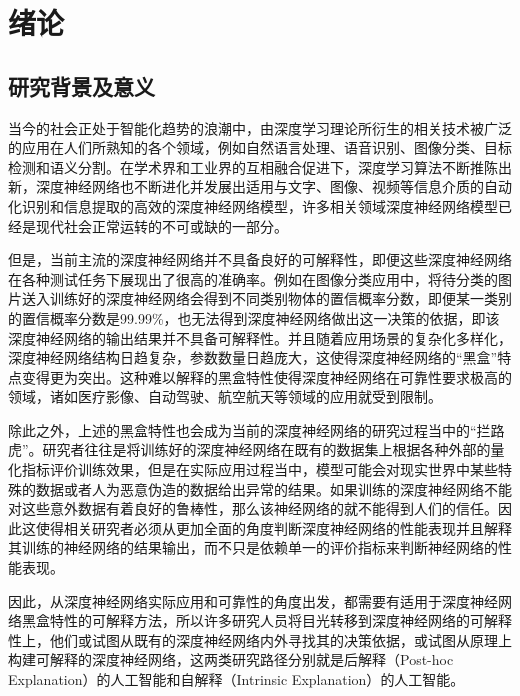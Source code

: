 


\chapter{绪论}
\thispagestyle{others}
\pagestyle{others}
\xiaosi

\section{研究背景及意义}
当今的社会正处于智能化趋势的浪潮中，由深度学习理论所衍生的相关技术被广泛的应用在人们所熟知的各个领域，例如自然语言处理\textsuperscript{\cite{language}}、语音识别\textsuperscript{\cite{voice}}、图像分类\textsuperscript{\cite{image,simonyan2014very}}、目标检测\textsuperscript{\cite{od1,od2}}和语义分割\textsuperscript{\cite{sg1,sg2}}。在学术界和工业界的互相融合促进下，深度学习算法不断推陈出新，深度神经网络也不断进化并发展出适用与文字、图像、视频等信息介质的自动化识别和信息提取的高效的深度神经网络模型，许多相关领域深度神经网络模型已经是现代社会正常运转的不可或缺的一部分。

但是，当前主流的深度神经网络并不具备良好的可解释性，即便这些深度神经网络在各种测试任务下展现出了很高的准确率。例如在图像分类应用中，将待分类的图片送入训练好的深度神经网络会得到不同类别物体的置信概率分数，即便某一类别的置信概率分数是99.99\%，也无法得到深度神经网络做出这一决策的依据\textsuperscript{\cite{machine}}，即该深度神经网络的输出结果并不具备可解释性。并且随着应用场景的复杂化多样化，深度神经网络结构日趋复杂，参数数量日趋庞大，这使得深度神经网络的“黑盒”特点变得更为突出。这种难以解释的黑盒特性使得深度神经网络在可靠性要求极高的领域，诸如医疗影像、自动驾驶、航空航天\textsuperscript{\cite{arospace}}等领域的应用就受到限制。

除此之外，上述的黑盒特性也会成为当前的深度神经网络的研究过程当中的“拦路虎”。研究者往往是将训练好的深度神经网络在既有的数据集上根据各种外部的量化指标评价训练效果，但是在实际应用过程当中，模型可能会对现实世界中某些特殊的数据或者人为恶意伪造的数据给出异常的结果。如果训练的深度神经网络不能对这些意外数据有着良好的鲁棒性，那么该神经网络的就不能得到人们的信任。因此这使得相关研究者必须从更加全面的角度判断深度神经网络的性能表现并且解释其训练的神经网络的结果输出，而不只是依赖单一的评价指标来判断神经网络的性能表现。

因此，从深度神经网络实际应用和可靠性的角度出发，都需要有适用于深度神经网络黑盒特性的可解释方法，所以许多研究人员将目光转移到深度神经网络的可解释性上，他们或试图从既有的深度神经网络内外寻找其的决策依据，或试图从原理上构建可解释的深度神经网络，这两类研究路径分别就是后解释（Post-hoc Explanation）\textsuperscript{\cite{post,post2}}的人工智能和自解释（Intrinsic Explanation）\textsuperscript{\cite{Intrinsic1,Intrinsic2,Intrinsic3,Intrinsic4,Intrinsic5,Intrinsic6}}的人工智能。

